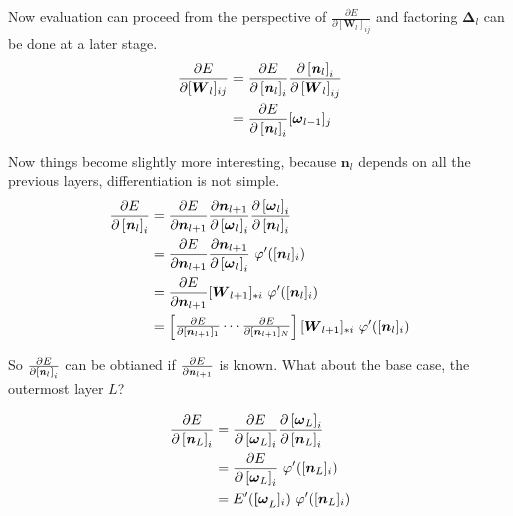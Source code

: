 \documentclass[12pt,letterpaper]{article}
\begin{document}
Now evaluation can proceed from the perspective of $\frac{\partial E}{\partial [\boldsymbol{W}_l]_{ij}}$ and factoring $\boldsymbol{\Delta}_l$ can be done at a later stage.
\begin{align}
\frac{\partial E}{\partial [\boldsymbol{W}_l]_{ij}}
&=
\frac{\partial E}{ \partial \left[ \textbf{\textit{n}}_l \right]_i }
\frac{ \partial \left[ \textbf{\textit{n}}_l \right]_i }{ \partial \left[ \boldsymbol{W}_l \right]_{ij} } \\ 
&=
\frac{\partial E}{ \partial \left[ \textbf{\textit{n}}_l \right]_i }[\boldsymbol{\omega}_{l-1}]_j
\end{align}

Now things become slightly more interesting, because $\boldsymbol{n}_l$ depends on all the previous layers, differentiation is not simple.
\begin{align}
\frac{\partial E}{ \partial \left[ \textbf{\textit{n}}_l \right]_i } 
&= 
\frac{\partial E}{\partial \boldsymbol{n}_{l+1}}
\frac{\partial \boldsymbol{n}_{l+1}}{ \partial \left[ \boldsymbol{\omega}_l \right]_i }
\frac{\partial \left[ \boldsymbol{\omega}_l \right]_i}{ \partial \left[ \boldsymbol{n}_l \right]_i } \\
&=
\frac{\partial E}{\partial \boldsymbol{n}_{l+1}}
\frac{\partial \boldsymbol{n}_{l+1}}{ \partial \left[ \boldsymbol{\omega}_l \right]_i }
\ \varphi'([\boldsymbol{n}_l]_i) \\
&=
\frac{\partial E}{\partial \boldsymbol{n}_{l+1}}
[\boldsymbol{W}_{l+1}]_{*i}
\ \varphi'([\boldsymbol{n}_l]_i) \\
&= 
\begin{bmatrix}
\frac{\partial E}{\partial [\boldsymbol{n}_{l+1}]_1} 
\cdots 
\frac{\partial E}{\partial [\boldsymbol{n}_{l+1}]_N}
\end{bmatrix}
[\boldsymbol{W}_{l+1}]_{*i} 
\ \varphi'([\boldsymbol{n}_l]_i) \\
\end{align}

So 
$\frac{\partial E}{ \partial \left[ \textbf{\textit{n}}_l \right]_i }$
can be obtianed if 
$\frac{\partial E}{ \partial \textbf{\textit{n}}_{l+1} }$ is known.  What about the base case, the outermost layer $L$?

\begin{align}
\frac{\partial E}{ \partial \left[ \textbf{\textit{n}}_L \right]_i } 
&= 
\frac{\partial E}{ \partial \left[ \boldsymbol{\omega}_L \right]_i }
\frac{\partial \left[ \boldsymbol{\omega}_L \right]_i}{ \partial \left[ \boldsymbol{n}_L \right]_i } \\
&=
\frac{\partial E}{ \partial \left[ \boldsymbol{\omega}_L \right]_i }
\ \varphi'([\boldsymbol{n}_L]_i) \\
&=
E'(\boldsymbol{[\omega}_L]_i)
\ \varphi'([\boldsymbol{n}_L]_i)
\end{align}
\end{document}
